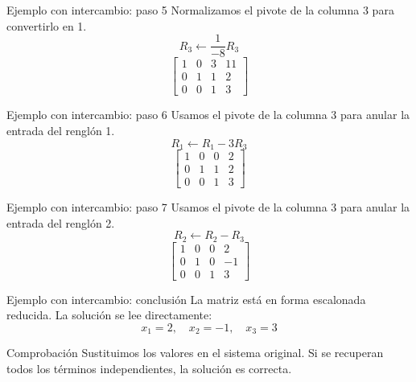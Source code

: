 \documentclass[aspectratio=169,9pt]{beamer}
\theoremstyle{remark}
\begin{document}
\begin{frame}[t]{Ejemplo con intercambio: paso 5}
Normalizamos el pivote de la columna 3 para convertirlo en 1.
\[
R_{3}\leftarrow \frac{1}{-8}R_{3}
\]
\[
\left[\begin{array}{ccc|c}
1 & 0 & 3 & 11\\
0 & 1 & 1 & 2\\
0 & 0 & 1 & 3
\end{array}\right]
\]
\end{frame}
\begin{frame}[t]{Ejemplo con intercambio: paso 6}
Usamos el pivote de la columna 3 para anular la entrada del renglón 1.
\[
R_{1}\leftarrow R_{1}-3R_{3}
\]
\[
\left[\begin{array}{ccc|c}
1 & 0 & 0 & 2\\
0 & 1 & 1 & 2\\
0 & 0 & 1 & 3
\end{array}\right]
\]
\end{frame}
\begin{frame}[t]{Ejemplo con intercambio: paso 7}
Usamos el pivote de la columna 3 para anular la entrada del renglón 2.
\[
R_{2}\leftarrow R_{2}-R_{3}
\]
\[
\left[\begin{array}{ccc|c}
1 & 0 & 0 & 2\\
0 & 1 & 0 & -1\\
0 & 0 & 1 & 3
\end{array}\right]
\]
\end{frame}
\begin{frame}[t]{Ejemplo con intercambio: conclusión}
La matriz está en forma escalonada reducida. La solución se lee directamente:
\[
\boxed{x_{1}=2,\quad x_{2}=-1,\quad x_{3}=3}
\]
\begin{block}{Comprobación}
Sustituimos los valores en el sistema original. Si se recuperan todos los términos independientes, la solución es correcta.
\end{block}
\end{frame}
\end{document}
